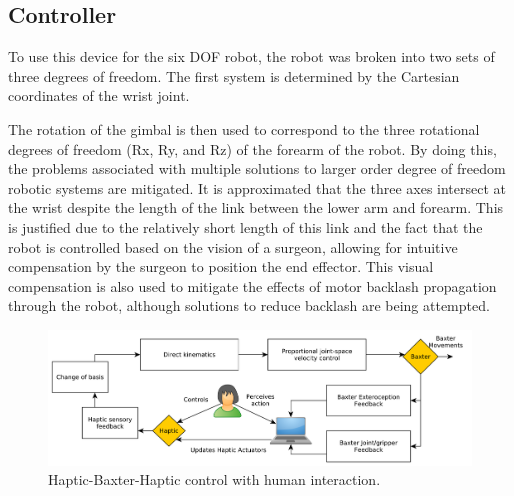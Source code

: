 \documentclass[journal,twoside]{JoPhA}
\begin{document}
% 
%
%
%





\subsection{Controller}
{\color{red}{Hay que adaptar a nuestro sistema}}

To use this device for the six DOF robot, the robot was broken into two 
sets of three degrees of freedom.  The first system is determined by 
the Cartesian coordinates of the wrist joint.  

The  rotation  of  the  gimbal  is  then  used  to  correspond  to  the  three rotational  degrees  of  freedom  (Rx,  Ry,  and  Rz)  of  the  forearm  of  the  robot.    
By  doing  this,  the  problems  associated  with  multiple  solutions  to  larger  order  degree  of  freedom  robotic  systems  are  mitigated.    
It  is  approximated  that  the  three  axes intersect  at  the  wrist despite the length of the link between the lower arm and forearm.  
This is justified due to the relatively short length of this link and the fact that the robot is controlled based on the vision of a surgeon, allowing for intuitive compensation by the surgeon to position the  end  effector.
This  visual  compensation  is  also  used  to  mitigate  the  effects  of  motor backlash propagation through the robot, although solutions to reduce backlash are being attempted.



\begin{figure}[ht!]
	\centering
	\includegraphics[width=.99\textwidth]{Figures/Controls.pdf} 
	\caption{Haptic-Baxter-Haptic control with human interaction.}
\end{figure}
\end{document}
